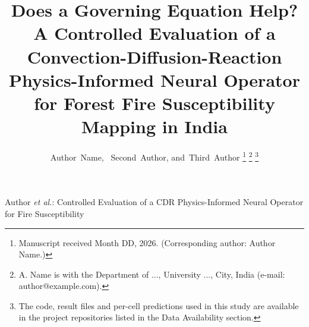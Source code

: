 \documentclass[journal]{IEEEtran}
\begin{document}
\title{Does a Governing Equation Help? A Controlled Evaluation of a Convection-Diffusion-Reaction Physics-Informed Neural Operator for Forest Fire Susceptibility Mapping in India}

\author{Author~Name,~
        Second~Author,
        and~Third~Author%
\thanks{Manuscript received Month DD, 2026. (Corresponding author: Author Name.)}%
\thanks{A. Name is with the Department of ..., University ..., City, India (e-mail: author@example.com).}%
\thanks{The code, result files and per-cell predictions used in this study are available in the project repositories listed in the Data Availability section.}}

%
{Author \MakeLowercase{\textit{et al.}}: Controlled Evaluation of a CDR Physics-Informed Neural Operator for Fire Susceptibility}

\maketitle
\end{document}
